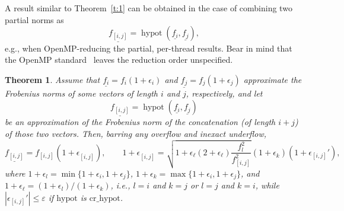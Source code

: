 \documentclass[a4paper,12pt,twoside]{article}
\newtheorem{thm}{Theorem}
\begin{document}
A result similar to Theorem~\ref{t:1} can be obtained in the case of
combining two partial norms as
\begin{displaymath}
  \underline{f_{[i,j]}}=\mathop{\mathrm{hypot}}(\underline{f_i},\underline{f_j}),
\end{displaymath}
e.g., when OpenMP-reducing the partial, per-thread results.  Bear in
mind that the OpenMP standard~\cite[\S 7.6.7]{OpenMP6} leaves the
reduction order unspecified.

\begin{thm}\label{t:2}
  Assume that $\underline{f_i}=f_i(1+\epsilon_i)$ and
  $\underline{f_j}=f_j(1+\epsilon_j)$ approximate the Frobenius norms
  of some vectors of length $i$ and $j$, respectively, and let
  \begin{displaymath}
    \underline{f_{[i,j]}}=\mathop{\mathrm{hypot}}(\underline{f_i},\underline{f_j})
  \end{displaymath}
  be an approximation of the Frobenius norm of the concatenation (of
  length $i+j$) of those two vectors.  Then, barring any overflow and
  inexact underflow,
  \begin{equation}
    \underline{f_{[i,j]}^{}}=f_{[i,j]^{}}(1+\epsilon_{[i,j]}^{}),\qquad
    1+\epsilon_{[i,j]}^{}=\sqrt{1+\epsilon_{\ell}(2+\epsilon_{\ell})\frac{f_l^2}{f_{[i,j]}^2}}(1+\epsilon_k^{})(1+\epsilon_{[i,j]}'),
    \label{e:8}
  \end{equation}
  where
  $1+\epsilon_l=\min\{1+\epsilon_i,1+\epsilon_j\}$,
  $1+\epsilon_k=\max\{1+\epsilon_i,1+\epsilon_j\}$, and
  $1+\epsilon_{\ell}=(1+\epsilon_l)/(1+\epsilon_k)$, i.e.,
  $l=i$ and $k=j$ or $l=j$ and $k=i$, while
  $|\epsilon_{[i,j]}'|\le\varepsilon$ if $\mathrm{hypot}$ is
  $\mathrm{cr\_hypot}$.
\end{thm}
\end{document}

